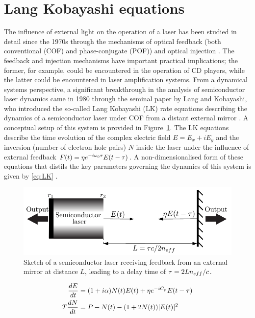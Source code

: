 \section*{Lang Kobayashi equations}
\label{sec:LK}
%
The influence of external light on the operation of a laser has been studied in detail since the 1970s through the mechanisms of optical feedback (both conventional (COF) and phase-conjugate (POF)) and optical injection \cite{weiss1991dynamics}. The feedback and injection mechanisms have important practical implications; the former, for example, could be encountered in the operation of CD players, while the latter could be encountered in laser amplification systems. From a dynamical systems perspective, a significant breakthrough in the analysis of semiconductor laser dynamics came in 1980 through the seminal paper by Lang and Kobayashi, who introduced the so-called Lang Kobayashi (LK) rate equations describing the dynamics of a semiconductor laser under COF from a distant external mirror \cite{lang1980external}. A conceptual setup of this system is provided in Figure~\ref{fig:COF}. The LK equations describe the time evolution of the complex electric field $E = E_x + i E_y$ and the inversion (number of electron-hole pairs) $N$ inside the laser under the influence of external feedback $F(t) = \eta e^{-i\omega_0\tau} E(t-\tau)$. A non-dimensionalised form of these equations that distils the key parameters governing the dynamics of this system is given by \eqref{eq:LK} \cite{heil2003delay}.
%
\begin{figure}[!t]
    \centering
    
    \includegraphics[width=0.7\linewidth]{Images/Introduction/COF_setup.pdf}
    
    \caption{Sketch of a semiconductor laser receiving feedback from an external mirror at distance $L$, leading to a delay time of $\tau=2Ln_{eff}/c$.}
    
    \label{fig:COF}
\end{figure}
%
\begin{equation}
\label{eq:LK}
    \begin{aligned}
        \frac{d E}{d t} & =(1+i \alpha) N(t) E(t)+\eta e^{-i C_p} E(t-\tau) \\
        T \frac{d N}{d t} & =P-N(t)-(1+2 N(t))|E(t)|^2
    \end{aligned}
\end{equation}
